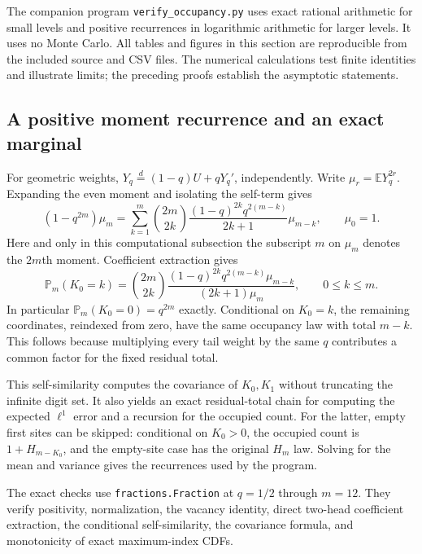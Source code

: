 \documentclass[11pt,a4paper]{article}
\numberwithin{equation}{section}
\theoremstyle{definition}
\theoremstyle{remark}
\newcommand{\E}{\mathbb E}
\newcommand{\PP}{\mathbb P}
\begin{document}
The companion program \texttt{verify\_occupancy.py} uses exact rational
arithmetic for small levels and positive recurrences in logarithmic
arithmetic for larger levels. It uses no Monte Carlo. All tables and
figures in this section are reproducible from the included source and
CSV files. The numerical calculations test finite identities and illustrate
limits; the preceding proofs establish the asymptotic statements.

\subsection{A positive moment recurrence and an exact marginal}
For geometric weights, $Y_q\overset d=(1-q)U+qY_q'$, independently.
Write $\mu_r=\E Y_q^{2r}$. Expanding the even moment and isolating the
self-term gives
\begin{equation}
(1-q^{2m})\mu_m
=\sum_{k=1}^m\binom{2m}{2k}
 \frac{(1-q)^{2k}q^{2(m-k)}}{2k+1}\mu_{m-k},\qquad \mu_0=1.
\label{eq:moment-recurrence}
\end{equation}
Here and only in this computational subsection the subscript $m$ on
$\mu_m$ denotes the $2m$th moment. Coefficient extraction gives
\begin{equation}
\PP_m(K_0=k)=\binom{2m}{2k}
 \frac{(1-q)^{2k}q^{2(m-k)}\mu_{m-k}}{(2k+1)\mu_m},
\qquad 0\le k\le m.
\label{eq:exact-marginal}
\end{equation}
In particular $\PP_m(K_0=0)=q^{2m}$ exactly.
Conditional on $K_0=k$, the remaining coordinates, reindexed from zero,
have the same occupancy law with total $m-k$. This follows because
multiplying every tail weight by the same $q$ contributes a common
factor for the fixed residual total.

This self-similarity computes the covariance of $K_0,K_1$ without
truncating the infinite digit set. It also yields an exact residual-total
chain for computing the expected $\ell^1$ error and a recursion for the
occupied count. For the latter, empty first sites can be skipped: conditional
on $K_0>0$, the occupied count is $1+H_{m-K_0}$, and the empty-site
case has the original $H_m$ law. Solving for the mean and variance gives
the recurrences used by the program.

The exact checks use \texttt{fractions.Fraction} at $q=1/2$ through
$m=12$. They verify positivity, normalization, the vacancy identity,
direct two-head coefficient extraction, the conditional self-similarity,
the covariance formula, and monotonicity of exact maximum-index CDFs.
\end{document}

